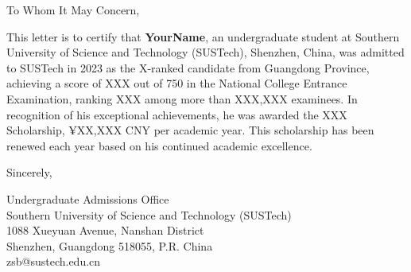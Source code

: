 \documentclass{letter}
\begin{document}
\begin{letter}{}
    \opening{To Whom It May Concern,}

    This letter is to certify that \textbf{YourName}, an undergraduate student at Southern University of Science and Technology (SUSTech), Shenzhen, China, was admitted to SUSTech in 2023 as the X-ranked  candidate from Guangdong Province, achieving a score of XXX out of 750 in the National College Entrance Examination, ranking XXX among more than XXX,XXX examinees. In recognition of his exceptional achievements, he was awarded the XXX Scholarship, ¥XX,XXX CNY per academic year. This scholarship has been renewed each year based on his continued academic excellence.


    \vspace{1cm}
    Sincerely,
    \vspace{0.5cm}
    
    Undergraduate Admissions Office   \\
    Southern University of Science and Technology (SUSTech) \\
    1088 Xueyuan Avenue, Nanshan District \\
    Shenzhen, Guangdong 518055, P.R. China \\
    {zsb@sustech.edu.cn}
 
\end{letter}
\end{document}

